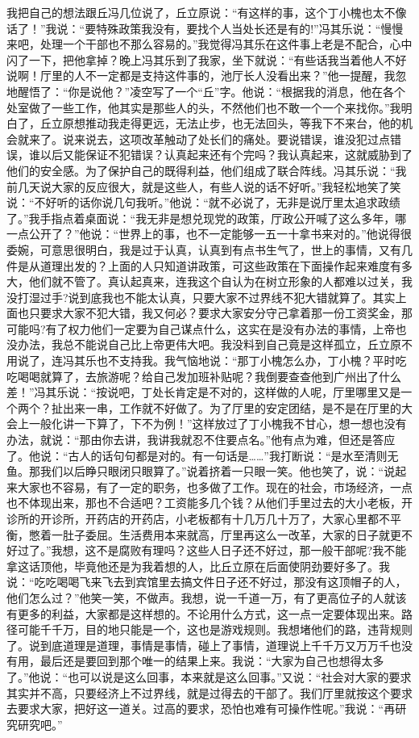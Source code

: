 \documentclass[12pt,oneside]{book}
\begin{document}
我把自己的想法跟丘冯几位说了，丘立原说：``有这样的事，这个丁小槐也太不像话了！''我说：``要特殊政策我没有，要找个人当处长还是有的!''冯其乐说：``慢慢来吧，处理一个干部也不那么容易的。''我觉得冯其乐在这件事上老是不配合，心中闪了一下，把他拿掉？晚上冯其乐到了我家，坐下就说：``有些话我当着他人不好说啊！厅里的人不一定都是支持这件事的，池厅长人没看出来？''他一提醒，我忽地醒悟了：``你是说他？''凌空写了一个``丘''字。他说：``根据我的消息，他在各个处室做了一些工作，他其实是那些人的头，不然他们也不敢一个一个来找你。''我明白了，丘立原想推动我走得更远，无法止步，也无法回头，等我下不来台，他的机会就来了。说来说去，这项改革触动了处长们的痛处。要说错误，谁没犯过点错误，谁以后又能保证不犯错误？认真起来还有个完吗？我认真起来，这就威胁到了他们的安全感。为了保护自己的既得利益，他们组成了联合阵线。冯其乐说：``我前几天说大家的反应很大，就是这些人，有些人说的话不好听。''我轻松地笑了笑说：``不好听的话你说几句我听。''他说：``就不必说了，无非是说厅里太追求政绩了。''我手指点着桌面说：``我无非是想兑现党的政策，厅政公开喊了这么多年，哪一点公开了？''他说：``世界上的事，也不一定能够一五一十拿书来对的。''他说得很委婉，可意思很明白，我是过于认真，认真到有点书生气了，世上的事情，又有几件是从道理出发的？上面的人只知道讲政策，可这些政策在下面操作起来难度有多大，他们就不管了。真认起真来，连我这个自认为在树立形象的人都难以过关，我没打湿过手?说到底我也不能太认真，只要大家不过界线不犯大错就算了。其实上面也只要求大家不犯大错，我又何必？要求大家安分守己拿着那一份工资奖金，那可能吗?有了权力他们一定要为自己谋点什么，这实在是没有办法的事情，上帝也没办法，我总不能说自己比上帝更伟大吧。我没料到自己竟是这样孤立，丘立原不用说了，连冯其乐也不支持我。我气恼地说：``那丁小槐怎么办，丁小槐？平时吃吃喝喝就算了，去旅游呢？给自己发加班补贴呢？我倒要查查他到广州出了什么差！''冯其乐说：``按说吧，丁处长肯定是不对的，这样做的人呢，厅里哪里又是一个两个？扯出来一串，工作就不好做了。为了厅里的安定团结，是不是在厅里的大会上一般化讲一下算了，下不为例！''这样放过了丁小槐我不甘心，想一想也没有办法，就说：``那由你去讲，我讲我就忍不住要点名。''他有点为难，但还是答应了。他说：``古人的话句句都是对的。有一句话是\ldots\ldots{}''我打断说：``是水至清则无鱼。那我们以后睁只眼闭只眼算了。''说着挤着一只眼一笑。他也笑了，说：``说起来大家也不容易，有了一定的职务，也多做了工作。现在的社会，市场经济，一点也不体现出来，那也不合适吧？工资能多几个钱？从他们手里过去的大小老板，开诊所的开诊所，开药店的开药店，小老板都有十几万几十万了，大家心里都不平衡，憋着一肚子委屈。生活费用本来就高，厅里再这么一改革，大家的日子就更不好过了。''我想，这不是腐败有理吗？这些人日子还不好过，那一般干部呢?我不能拿这话顶他，毕竟他还是为我着想的人，比丘立原在后面使阴劲要好多了。我说：``吃吃喝喝飞来飞去到宾馆里去搞文件日子还不好过，那没有这顶帽子的人，他们怎么过？''他笑一笑，不做声。我想，说一千道一万，有了更高位子的人就该有更多的利益，大家都是这样想的。不论用什么方式，这一点一定要体现出来。路径可能千千万，目的地只能是一个，这也是游戏规则。我想堵他们的路，违背规则了。说到底道理是道理，事情是事情，碰上了事情，道理说上千千万又万万千也没有用，最后还是要回到那个唯一的结果上来。我说：``大家为自己也想得太多了。''他说：``也可以说是这么回事，本来就是这么回事。''又说：``社会对大家的要求其实并不高，只要经济上不过界线，就是过得去的干部了。我们厅里就按这个要求去要求大家，把好这一道关。过高的要求，恐怕也难有可操作性呢。''我说：``再研究研究吧。''
\end{document}
